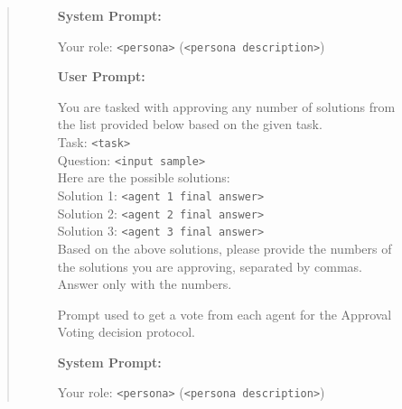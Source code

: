 \documentclass[11pt]{article}
\begin{document}
\begin{abstract}
\begin{figure}[H]
    \centering
    \begin{combinedprompt}
    \textbf{System Prompt:} \\
    \begingroup
    \colorbox{systemcolor}{\parbox{\dimexpr\linewidth-2\fboxsep\relax}{
    Your role: \texttt{<persona>} (\texttt{<persona description>})
    }}
    \endgroup

    \vspace{0.4em} %

    \textbf{User Prompt:} \\
    \begingroup
    \colorbox{usercolor}{\parbox{\dimexpr\linewidth-2\fboxsep\relax}{
    You are tasked with approving any number of solutions from the list provided below based on the given task.\\
    Task: \texttt{<task>}\\
    Question: \texttt{<input sample>}\\
    Here are the possible solutions:\\
    Solution 1: \texttt{<agent 1 final answer>}\\
    Solution 2: \texttt{<agent 2 final answer>}\\
    Solution 3: \texttt{<agent 3 final answer>}\\
    Based on the above solutions, please provide the numbers of the solutions you are approving, separated by commas. Answer only with the numbers.
    }}
    \endgroup
\end{combinedprompt}
    \caption{Prompt used to get a vote from each agent for the Approval Voting decision protocol.}
    \label{fig:approval_voting_prompt}
\end{figure}

\begin{figure}[H]
    \centering
    \begin{combinedprompt}
    \textbf{System Prompt:} \\
    \begingroup
    \colorbox{systemcolor}{\parbox{\dimexpr\linewidth-2\fboxsep\relax}{
    Your role: \texttt{<persona>} (\texttt{<persona description>})
    }}
    \endgroup

    \vspace{0.4em} %


\end{combinedprompt}
\end{figure}
\end{abstract}
\end{document}
